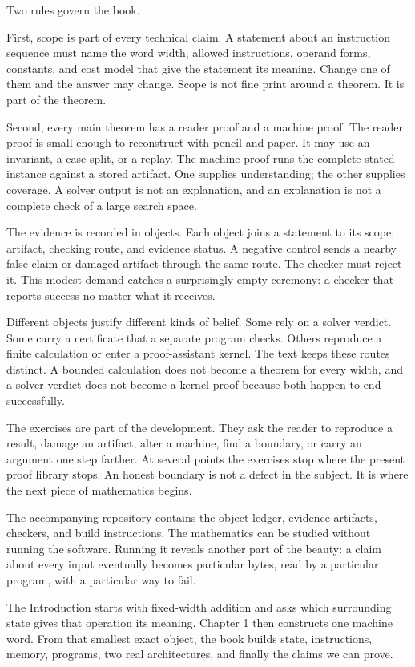 Two rules govern the book.

First, scope is part of every technical claim. A statement about an
instruction sequence must name the word width, allowed instructions, operand
forms, constants, and cost model that give the statement its meaning. Change
one of them and the answer may change. Scope is not fine print around a
theorem. It is part of the theorem.

Second, every main theorem has a reader proof and a machine proof. The reader
proof is small enough to reconstruct with pencil and paper. It may use an
invariant, a case split, or a replay. The machine proof runs the complete
stated instance against a stored artifact. One supplies understanding; the
other supplies coverage. A solver output is not an explanation, and an
explanation is not a complete check of a large search space.

The evidence is recorded in objects. Each object joins a statement to its
scope, artifact, checking route, and evidence status. A negative control sends
a nearby false claim or damaged artifact through the same route. The checker
must reject it. This modest demand catches a surprisingly empty ceremony: a
checker that reports success no matter what it receives.

Different objects justify different kinds of belief. Some rely on a solver
verdict. Some carry a certificate that a separate program checks. Others
reproduce a finite calculation or enter a proof-assistant kernel. The text
keeps these routes distinct. A bounded calculation does not become a theorem
for every width, and a solver verdict does not become a kernel proof because
both happen to end successfully.

The exercises are part of the development. They ask the reader to reproduce
a result, damage an artifact, alter a machine, find a boundary, or carry an
argument one step farther. At several points the exercises stop where the
present proof library stops. An honest boundary is not a defect in the
subject. It is where the next piece of mathematics begins.

The accompanying repository contains the object ledger, evidence artifacts,
checkers, and build instructions. The mathematics can be studied without
running the software. Running it reveals another part of the beauty: a claim
about every input eventually becomes particular bytes, read by a particular
program, with a particular way to fail.

The Introduction starts with fixed-width addition and asks which surrounding
state gives that operation its meaning. Chapter 1 then constructs one machine
word. From that smallest exact object, the book builds state, instructions,
memory, programs, two real architectures, and finally the claims we can prove.
